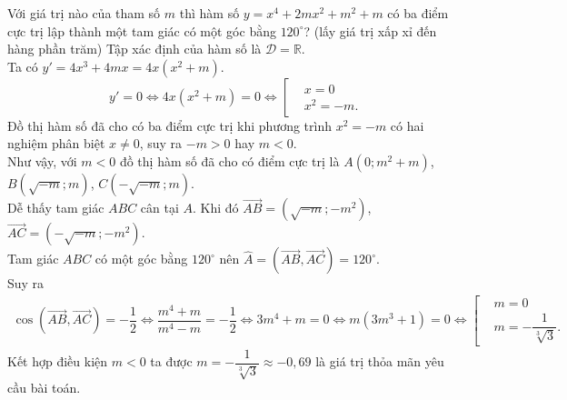 \begin{ex}%
Với giá trị nào của tham số $m$ thì hàm số $y=x^4+2mx^2+m^2+m$ có ba điểm cực trị lập thành một tam giác có một góc bằng $120^\circ$? (lấy giá trị xấp xỉ đến hàng phần trăm)
\loigiai
{
Tập xác định của hàm số là $\mathscr{D}=\mathbb{R}$.\\
Ta có $y'=4x^3+4mx = 4x(x^2+m)$.
$$y'=0 \Leftrightarrow 4x(x^2+m)=0 \Leftrightarrow \left[\begin{aligned}&x=0 \\&x^2=-m.\end{aligned}\right.$$
Đồ thị hàm số đã cho có ba điểm cực trị khi phương trình $x^2=-m$ có hai nghiệm phân biệt $x\neq 0$, suy ra $-m >0$ hay $m < 0$.\\
Như vậy, với $m<0$ đồ thị hàm số đã cho có điểm cực trị là $A(0;m^2+m)$, $B\left(\sqrt{-m};m\right)$, $C\left(-\sqrt{-m};m\right)$.\\
Dễ thấy tam giác $ABC$ cân tại $A$. Khi đó $\overrightarrow{AB}=\left(\sqrt{-m};-m^2\right)$, $\overrightarrow{AC} = \left(-\sqrt{-m}; -m^2\right)$.\\
Tam giác $ABC$ có một góc bằng $120^\circ$ nên $\widehat{A} = \left(\overrightarrow{AB},\overrightarrow{AC}\right) = 120^\circ$.\\
Suy ra
\begin{eqnarray*}
\cos\left(\overrightarrow{AB},\overrightarrow{AC}\right) = -\dfrac{1}{2} \Leftrightarrow \dfrac{m^4+m}{m^4-m} = -\dfrac{1}{2} \Leftrightarrow 3m^4+m=0 \Leftrightarrow m(3m^3+1)=0 \Leftrightarrow \left[\begin{aligned}&m=0 \\&m=-\dfrac{1}{\sqrt[3]{3}}.\end{aligned}\right.
\end{eqnarray*}
Kết hợp điều kiện $m<0$ ta được $m=-\dfrac{1}{\sqrt[3]{3}}\approx -0{,}69$ là giá trị thỏa mãn yêu cầu bài toán.
}
\end{ex}

